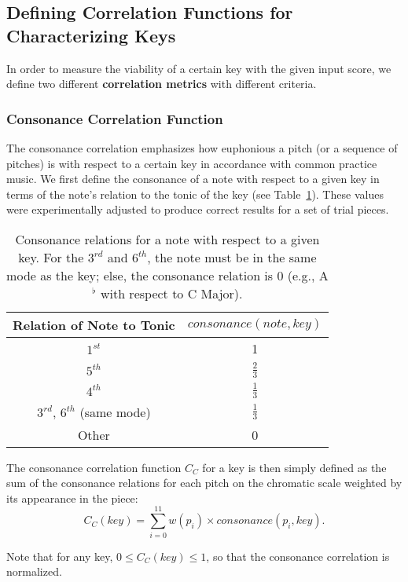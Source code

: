 \documentclass[11pt]{article}
\begin{document}
\subsection{Defining Correlation Functions for Characterizing Keys}
In order to measure the viability of a certain key with the given input score, we define two different {\bf correlation metrics} with different criteria.

\subsubsection{Consonance Correlation Function}
The consonance correlation emphasizes how euphonious a pitch (or a sequence of pitches) is with respect to a certain key in accordance with common practice music. We first define the consonance of a note with respect to a given key in terms of the note's relation to the tonic of the key (see Table~\ref{consonance}). These values were experimentally adjusted to produce correct results for a set of trial pieces.

\begin{table}[h]
\centering
\begin{tabular}{|c|c|}
\hline {\bf Relation of Note to Tonic} & $consonance(note, key)$ \\
\hline $1^{st}$ & 1 \\
\hline $5^{th}$ & $\frac{2}{3}$ \\
\hline $4^{th}$ & $\frac{1}{3}$ \\
\hline $3^{rd}$, $6^{th}$ (same mode) & $\frac{1}{3}$ \\
\hline Other & 0 \\
\hline
\end{tabular}
\caption{Consonance relations for a note with respect to a given key. For the $3^{rd}$ and $6^{th}$, the note must be in the same mode as the key; else, the consonance relation is 0 (e.g., A$^\flat$ with respect to C Major).}
\label{consonance}
\end{table}

The consonance correlation function $C_C$ for a key is then simply defined as the sum of the consonance relations for each pitch on the chromatic scale weighted by its appearance in the piece:
\[C_C(key) = \sum_{i=0}^{11} w(p_i) \times consonance(p_i, key).\]

Note that for any key, $0\leq C_C(key) \leq 1$, so that the consonance correlation is normalized.
\end{document}
